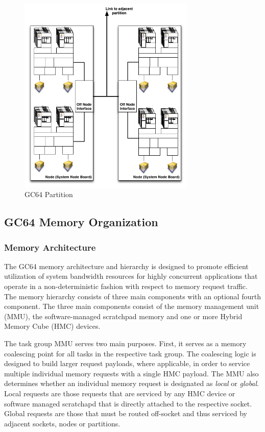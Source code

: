 \documentclass{article}
\begin{document}
\begin{figure}[h!]
\begin{center}
\includegraphics[width=0.75\textwidth]{gc64-partition.png}
\caption{GC64 Partition}
\end{center}
\label{figure:partition}
\end{figure} 

\subsection{GC64 Memory Organization}

\subsubsection{Memory Architecture}

The GC64 memory architecture and hierarchy is designed
to promote efficient utilization of system bandwidth resources
for highly concurrent applications that operate in a non-deterministic
fashion with respect to memory request traffic.  The memory hierarchy
consists of three main components with an optional fourth component. 
The three main components consist of the memory management unit (MMU), 
the software-managed scratchpad memory and one or more Hybrid Memory
Cube (HMC) devices.

The task group MMU serves two main purposes.  First, it serves as a 
memory coalescing point for all tasks in the respective task group.
The coalescing logic is designed to build larger request payloads, where
applicable, in order to service multiple individual memory requests with 
a single HMC payload.  The MMU also determines whether an individual 
memory request is designated as \emph{local} or \emph{global}.  Local
requests are those requests that are serviced by any HMC device or software 
managed scratchapd that is directly attached to the respective socket.  
Global requests are those that must be routed off-socket and thus serviced by 
adjacent sockets, nodes or partitions. 
\end{document}

